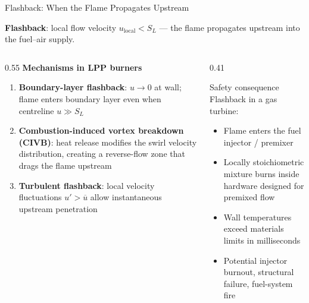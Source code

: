 \documentclass[12pt,aspectratio=169]{beamer}
\newcommand{\SL}{S_L}
\begin{document}
\begin{frame}{Flashback: When the Flame Propagates Upstream}

  \textbf{Flashback}: local flow velocity $u_{\text{local}} < \SL$
  --- the flame propagates upstream into the fuel--air supply.

  \begin{columns}[t]
    \begin{column}{0.55\textwidth}
      \textbf{Mechanisms in LPP burners}
      \begin{enumerate}
        \item \textbf{Boundary-layer flashback}:
              $u \to 0$ at wall; flame enters boundary layer
              even when centreline $u \gg \SL$
        \item \textbf{Combustion-induced vortex breakdown
              (CIVB)}: heat release modifies the swirl velocity
              distribution, creating a reverse-flow zone
              that drags the flame upstream
        \item \textbf{Turbulent flashback}:
              local velocity fluctuations $u' > \overline{u}$
              allow instantaneous upstream penetration
      \end{enumerate}
    \end{column}
    \begin{column}{0.41\textwidth}
      \begin{alertblock}{Safety consequence}
        Flashback in a gas turbine:
        \begin{itemize}
          \item Flame enters the fuel injector / premixer
          \item Locally stoichiometric mixture burns
                inside hardware designed for premixed flow
          \item Wall temperatures exceed materials limits
                in milliseconds
          \item Potential injector burnout, structural
                failure, fuel-system fire
        \end{itemize}
      \end{alertblock}
    \end{column}
  \end{columns}
\end{frame}
\end{document}
